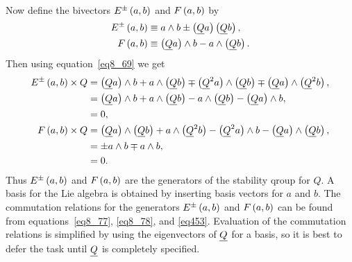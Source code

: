 Now define the bivectors ${E^{\pm}}\left ( {a,b} \right )$ and ${F}\left ( {a,b} \right )$ by
\begin{align}
	{E^{\pm}}\left ( {a,b} \right ) &\equiv a\wedge b \pm\left ( {\underline{Q}a} \right )\left ( {\underline{Q}b} \right ), \label{eq8_77}\\
	{F}\left ( {a,b} \right ) &\equiv \left ( {\underline{Q}a} \right )\wedge b -a\wedge\left ( {\underline{Q}b} \right ). \label{eq8_78}
\end{align}
Then using equation~\ref{eq8_69} we get
\begin{align}
	{E^{\pm}}\left ( {a,b} \right )\times Q &= \left ( {\underline{Q}a} \right )\wedge b+a\wedge\left ( {\underline{Q}b} \right )
	                            \mp\left ( {\underline{Q}^{2}a} \right )\wedge\left ( {\underline{Q}b} \right )
	                            \mp\left ( {\underline{Q}a} \right )\wedge\left ( {\underline{Q}^{2}b} \right ), \nonumber \\
	                         &= \left ( {\underline{Q}a} \right )\wedge b+a\wedge\left ( {\underline{Q}b} \right )
	                            -a\wedge\left ( {\underline{Q}b} \right )-\left ( {\underline{Q}a} \right )\wedge b, \nonumber \\
	                         &= 0, \\
	{F}\left ( {a,b} \right )\times Q &= \left ( {\underline{Q}a} \right )\wedge\left ( {\underline{Q}b} \right )+a\wedge\left ( {\underline{Q}^{2}b} \right )
	                      -\left ( {\underline{Q}^{2}a} \right )\wedge b-\left ( {\underline{Q}a} \right )\wedge\left ( {\underline{Q}b} \right ), \nonumber \\
	                   &= \pm a\wedge b \mp a\wedge b, \nonumber \\
	                   &= 0.      
\end{align}
Thus ${E^{\pm}}\left ( {a,b} \right )$ and ${F}\left ( {a,b} \right )$ are the generators of the stability qroup for $Q$.  A basis
for the Lie algebra is obtained by inserting basis vectors for $a$ and $b$.  The commutation relations
for the generators ${E^{\pm}}\left ( {a,b} \right )$ and ${F}\left ( {a,b} \right )$ can be found from equations~\ref{eq8_77},
\ref{eq8_78}, and \ref{eq453}.  Evaluation of the commutation relations is simplified by using the 
eigenvectors of $\underline{Q}$ for a basis, so it is best to defer the task until $\underline{Q}$ is completely
specified.

